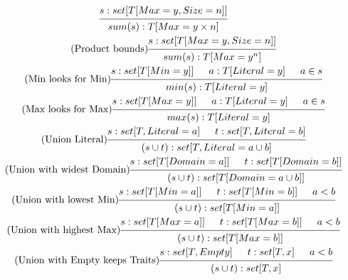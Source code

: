 \documentclass{article}
\begin{document}
\begin{gather}
\begin{prooftree}
        \hypo{s: set[T[Max=y, Size=n]]}
        \infer1{sum(s): T[Max=y\times n]}
    \end{prooftree}
    \\
    \tag{Product bounds}
    \begin{prooftree}
        \hypo{s: set[T[Max=y, Size=n]]}
        \infer1{sum(s): T[Max=y^n]}
    \end{prooftree}
    \\
    \tag{Min looks for Min}
    \begin{prooftree}
        \hypo{s: set[T[Min=y]]}
        \hypo{a: T[Literal=y]}
        \hypo{a \in s}
        \infer3{min(s): T[Literal=y]}
    \end{prooftree}
    \\
    \tag{Max looks for Max}
    \begin{prooftree}
        \hypo{s: set[T[Max=y]]}
        \hypo{a: T[Literal=y]}
        \hypo{a \in s}
        \infer3{max(s): T[Literal=y]}
    \end{prooftree}
    \\
    \tag{Union Literal}
    \begin{prooftree}
        \hypo{s: set[T, Literal=a]}
        \hypo{t: set[T, Literal=b]}
        \infer2{(s \cup t): set[T, Literal=a \cup b]}
    \end{prooftree}
    \\
    \tag{Union with widest Domain}
    \begin{prooftree}
        \hypo{s: set[T[Domain=a]]}
        \hypo{t: set[T[Domain=b]]}
        \infer2{(s \cup t): set[T[Domain=a \cup b]]}
    \end{prooftree}
    \\
    \tag{Union with lowest Min}
    \begin{prooftree}
        \hypo{s: set[T[Min=a]]}
        \hypo{t: set[T[Min=b]]}
        \hypo{a < b}
        \infer3{(s \cup t): set[T[Min=a]]}
    \end{prooftree}
    \\
    \tag{Union with highest Max}
    \begin{prooftree}
        \hypo{s: set[T[Max=a]]}
        \hypo{t: set[T[Max=b]]}
        \hypo{a < b}
        \infer3{(s \cup t): set[T[Max=b]]}
    \end{prooftree}
    \\
    \tag{Union with Empty keeps Traits}
    \begin{prooftree}
        \hypo{s: set[T, Empty]}
        \hypo{t: set[T, x]}
        \hypo{a < b}
        \infer3{(s \cup t): set[T, x]}

\end{prooftree}
\end{gather}
\end{document}
